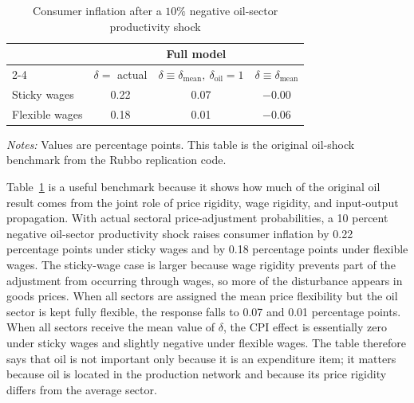 \documentclass[12pt]{article}
\begin{document}
\begin{table}[htbp]
    \centering
    \caption{Consumer inflation after a $10\%$ negative oil-sector productivity shock}
    \label{tab:oil_cpi_original}
    \begin{tabular}{lccc}
        \toprule
        & \multicolumn{3}{c}{Full model} \\
        \cmidrule(lr){2-4}
        & $\delta =$ actual
        & $\delta \equiv \delta_{\mathrm{mean}},\ \delta_{\mathrm{oil}}=1$
        & $\delta \equiv \delta_{\mathrm{mean}}$ \\
        \midrule
        Sticky wages   & 0.22 & 0.07 & $-0.00$ \\
        Flexible wages & 0.18 & 0.01 & $-0.06$ \\
        \bottomrule
    \end{tabular}
    \begin{flushleft}
        \footnotesize
        \textit{Notes:} Values are percentage points. This table is the original
        oil-shock benchmark from the Rubbo replication code.
    \end{flushleft}
\end{table}

Table~\ref{tab:oil_cpi_original} is a useful benchmark because it shows how much of
the original oil result comes from the joint role of price rigidity, wage rigidity, and
input-output propagation. With actual sectoral price-adjustment probabilities, a
10 percent negative oil-sector productivity shock raises consumer inflation by
0.22 percentage points under sticky wages and by 0.18 percentage points under flexible
wages. The sticky-wage case is larger because wage rigidity prevents part of the
adjustment from occurring through wages, so more of the disturbance appears in goods
prices. When all sectors are assigned the mean price flexibility but the oil sector is
kept fully flexible, the response falls to 0.07 and 0.01 percentage points. When all
sectors receive the mean value of $\delta$, the CPI effect is essentially zero under
sticky wages and slightly negative under flexible wages. The table therefore says that
oil is not important only because it is an expenditure item; it matters because oil is
located in the production network and because its price rigidity differs from the
average sector.
\end{document}
